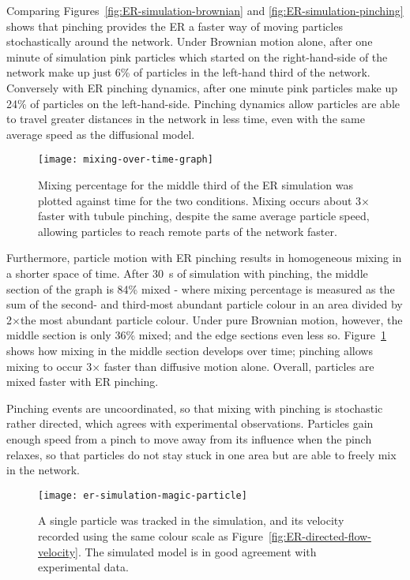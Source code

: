 Comparing Figures~\ref{fig:ER-simulation-brownian} and \ref{fig:ER-simulation-pinching} shows that pinching provides the ER a faster way of moving particles stochastically around the network. 
Under Brownian motion alone, after one minute of simulation pink particles which started on the right-hand-side of the network make up just 6\% of particles in the left-hand third of the network. 
Conversely with ER pinching dynamics, after one minute pink particles make up 24\% of particles on the left-hand-side. 
Pinching dynamics allow particles are able to travel greater distances in the network in less time, even with the same average speed as the diffusional model. 

\begin{figure}[htbp!]
	\centering
	\texttt{[image: mixing-over-time-graph]}
	\caption[ER simulation: Tubule pinching provides faster mixing than Brownian motion alone]{Mixing percentage for the middle third of the ER simulation was plotted against time for the two conditions. Mixing occurs about 3$\times$ faster with tubule pinching, despite the same average particle speed, allowing particles to reach remote parts of the network faster.}
	\label{fig:mixing-over-time-graph}
\end{figure}

Furthermore, particle motion with ER pinching results in homogeneous mixing in a shorter space of time. 
After \SI{30}{\second} of simulation with pinching, the middle section of the graph is 84\% mixed - where mixing percentage is measured as the sum of the second- and third-most abundant particle colour in an area divided by 2$\times$the most abundant particle colour. 
Under pure Brownian motion, however, the middle section is only 36\% mixed; and the edge sections even less so. 
Figure~\ref{fig:mixing-over-time-graph} shows how mixing in the middle section develops over time; pinching allows mixing to occur 3$\times$ faster than diffusive motion alone. 
Overall, particles are mixed faster with ER pinching. 

Pinching events are uncoordinated, so that mixing with pinching is stochastic rather directed, which agrees with experimental observations. 
Particles gain enough speed from a pinch to move away from its influence when the pinch relaxes, so that particles do not stay stuck in one area but are able to freely mix in the network. 
 
\begin{figure}[htbp!]
	\centering
	\texttt{[image: er-simulation-magic-particle]}
	\caption[ER simulation: The simulated model shows similar particle velocity tracks to experimental data]{A single particle was tracked in the simulation, and its velocity recorded using the same colour scale as Figure~\ref{fig:ER-directed-flow-velocity}. The simulated model is in good agreement with experimental data. }
	\label{fig:ER-simulation-magic-particle}
\end{figure}

